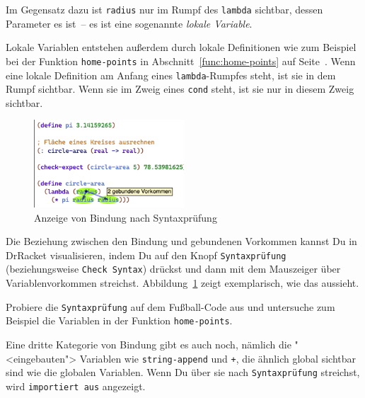 Im Gegensatz dazu ist \lstinline{radius} nur im Rumpf des
\lstinline{lambda} sichtbar, dessen Parameter es ist~-- es ist eine
sogenannte \textit{lokale Variable}.

Lokale Variablen entstehen außerdem durch lokale Definitionen wie zum
Beispiel bei der Funktion \lstinline{home-points} in
Abschnitt~\ref{func:home-points} auf Seite~\pageref{func:home-points}.
Wenn eine lokale Definition am Anfang eines \lstinline{lambda}-Rumpfes
steht, ist sie in dem Rumpf sichtbar.  Wenn sie im Zweig eines
\lstinline{cond} steht, ist sie nur in diesem Zweig sichtbar.

\begin{figure}[tb]
  \centering
  \includegraphics[width=0.5\textwidth]{i1hop/binding}
  \caption{Anzeige von Bindung nach Syntaxprüfung}
  \label{fig:binding}
\end{figure}

Die Beziehung zwischen den Bindung und gebundenen Vorkommen kannst
Du in DrRacket visualisieren, indem Du auf den Knopf
\texttt{Syntaxprüfung} (beziehungsweise \texttt{Check Syntax})
drückst und dann mit dem Mauszeiger über Variablenvorkommen
streichst.  Abbildung~\ref{fig:binding} zeigt exemplarisch, wie das aussieht.

\begin{aufgabeinline}
  Probiere die \texttt{Syntaxprüfung} auf dem Fußball-Code aus und
  untersuche zum Beispiel die Variablen in der Funktion
  \lstinline{home-points}.
\end{aufgabeinline}

Eine dritte Kategorie von Bindung gibt es auch noch, nämlich die
"<eingebauten"> Variablen wie \texttt{string-append} und
\lstinline{+}, die ähnlich global sichtbar sind wie die globalen
Variablen.  Wenn Du über sie nach \texttt{Syntaxprüfung} streichst,
wird \texttt{importiert aus} angezeigt.

